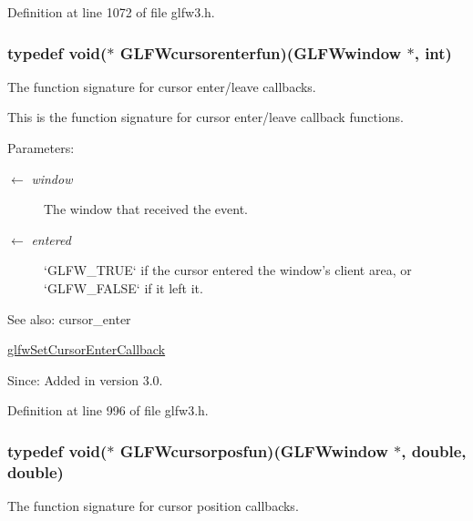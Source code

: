 Definition at line 1072 of file glfw3.h.\hypertarget{group__input_g762d898d9b0241d7e3e3b767c6cf318f}{
\subsubsection[GLFWcursorenterfun]{\setlength{\rightskip}{0pt plus 5cm}typedef void($\ast$  {\bf GLFWcursorenterfun})({\bf GLFWwindow} $\ast$, int)}}
\label{group__input_g762d898d9b0241d7e3e3b767c6cf318f}


The function signature for cursor enter/leave callbacks. 

This is the function signature for cursor enter/leave callback functions.

\begin{Desc}
\item[Parameters:]
\begin{description}
\item[\mbox{$\leftarrow$} {\em window}]The window that received the event. \item[\mbox{$\leftarrow$} {\em entered}]`GLFW\_\-TRUE` if the cursor entered the window's client area, or `GLFW\_\-FALSE` if it left it.\end{description}
\end{Desc}
\begin{Desc}
\item[See also:]cursor\_\-enter 

\hyperlink{group__input_ga20014985561efeb2c53f1956f727830}{glfwSetCursorEnterCallback}\end{Desc}
\begin{Desc}
\item[Since:]Added in version 3.0. \end{Desc}


Definition at line 996 of file glfw3.h.\hypertarget{group__input_g592fbfef76d88f027cb1bc4c36ebd437}{
\subsubsection[GLFWcursorposfun]{\setlength{\rightskip}{0pt plus 5cm}typedef void($\ast$  {\bf GLFWcursorposfun})({\bf GLFWwindow} $\ast$, double, double)}}
\label{group__input_g592fbfef76d88f027cb1bc4c36ebd437}


The function signature for cursor position callbacks. 


